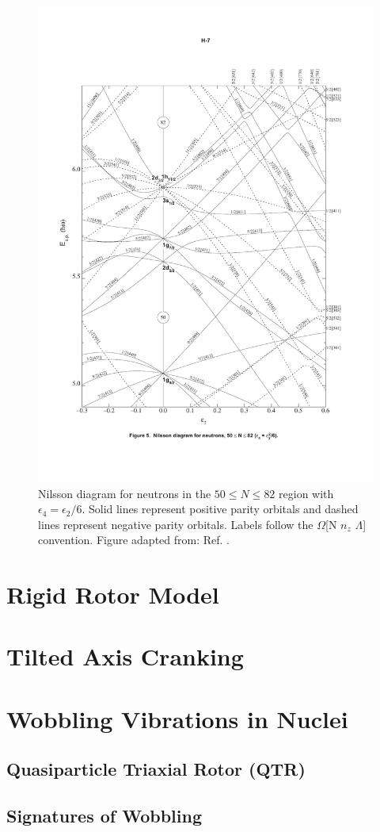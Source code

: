 \begin{figure}
\label{fig:chp2-nillson-neutrons}
\centerline{\includegraphics[height=0.8\textheight,clip=true,trim=10 100 10 100]{./img/c2/nilsson_neutron_diagram.pdf}}
	\caption{Nilsson diagram for neutrons in the $50\leq N \leq 82$ region with $\epsilon_4=\epsilon_2/6$. Solid lines represent positive parity orbitals and dashed lines represent negative parity orbitals. Labels follow the $\Omega$[N $n_z$ $\Lambda$] convention. Figure adapted from: Ref. \cite{nilssonDiagrams}.}
\end{figure}

\section{Rigid Rotor Model}
\label{sec:models-rigid-rotor}

\section{Tilted Axis Cranking}
\label{sec:models-tac}

\section{Wobbling Vibrations in Nuclei}
\label{sec:models-wobbling}
\subsection{Quasiparticle Triaxial Rotor (QTR)}
\label{sec:models-qtr}
\subsection{Signatures of Wobbling}
\label{sec:models-sig}
